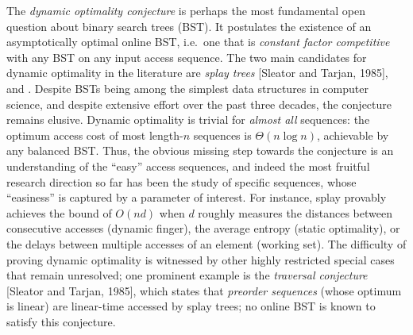 The {\em dynamic optimality conjecture} is perhaps the most fundamental open question about binary search trees (BST). It postulates the existence of an asymptotically optimal online BST, i.e.\ one that is {\em constant factor competitive} with any BST on any input access sequence. The two main candidates for dynamic optimality in the literature are {\em splay trees} [Sleator and Tarjan, 1985], and . Despite BSTs being among the simplest data structures in computer science, and despite extensive effort over the past three decades, the conjecture remains elusive. Dynamic optimality is trivial for \emph{almost all} sequences: the optimum access cost of most 
length-$n$ sequences is $\Theta(n \log n)$, 
achievable by any balanced BST. 
Thus, the obvious missing step towards the conjecture is an understanding of the ``easy'' access sequences, and indeed the most fruitful research direction so far has been the study of specific sequences, whose ``easiness'' is captured by a parameter of interest.
For instance, splay provably achieves the bound of $O(n d)$ when $d$ roughly measures the distances between consecutive accesses (dynamic finger), the average entropy (static optimality), or the delays between multiple accesses of an element (working set). 
The difficulty of proving dynamic optimality is witnessed by other highly restricted special cases that remain unresolved; one prominent example is the {\em traversal conjecture} [Sleator and Tarjan, 1985], which states that {\em preorder sequences} (whose optimum is linear) are linear-time accessed by splay trees; no online BST is known to satisfy this conjecture.  

